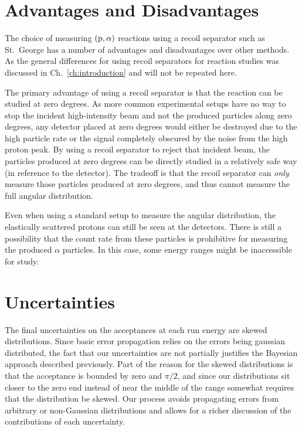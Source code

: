 \section{Advantages and Disadvantages}

The choice of measuring $({\rm p},\alpha)$ reactions using a recoil
separator such as St.\ George has a number of advantages and
disadvantages over other methods. As the general differences for using
recoil separators for reaction studies was discussed in
Ch.~\ref{ch:introduction} and will not be repeated here.

The primary advantage of using a recoil separator is that the reaction
can be studied at zero degrees. As more common experimental setups have
no way to stop the incident high-intensity beam and not the produced
particles along zero degrees, any detector placed at zero degrees would
either be destroyed due to the high particle rate or the signal
completely obscured by the noise from the high proton peak. By using a
recoil separator to reject that incident beam, the particles produced at
zero degrees can be directly studied in a relatively safe way (in
reference to the detector). The tradeoff is that the recoil separator
can \textit{only} measure those particles produced at zero degrees, and
thus cannot measure the full angular distribution.

Even when using a standard setup to measure the angular distribution,
the elastically scattered protons can still be seen at the detectors.
There is still a possibility that the count rate from these particles is
prohibitive for measuring the produced $\alpha$ particles. In this case,
some energy ranges might be inaccessible for study.


\section{Uncertainties}
\label{sec:uncertainties}

The final uncertainties on the acceptances at each run energy are skewed
distributions. Since basic error propagation relies on the errors being
gaussian distributed, the fact that our uncertainties are not partially
justifies the Bayesian approach described previously. Part of the reason
for the skewed distributions is that the acceptance is bounded by zero
and $\pi/2$, and since our distributions sit closer to the zero end
instead of near the middle of the range somewhat requires that the
distribution be skewed. Our process avoids propagating errors from
arbitrary or non-Gaussian distributions and allows for a richer
discussion of the contributions of each uncertainty.

